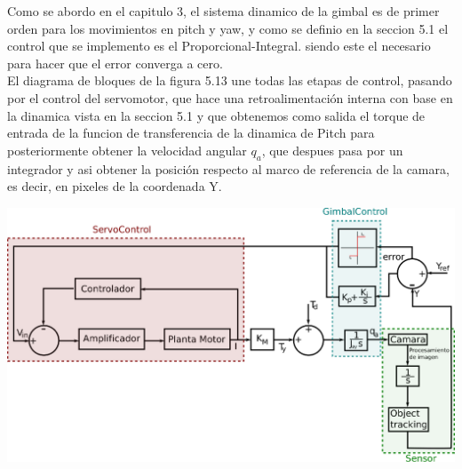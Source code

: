 Como se abordo en el capitulo 3, el sistema dinamico de la gimbal es de primer orden para los movimientos en pitch y yaw, y como se definio en la seccion 5.1
el control que se implemento es el Proporcional-Integral. siendo este el necesario para hacer que el error converga a cero.\\
El diagrama de bloques de la figura 5.13 une todas las etapas de control, pasando por el control del servomotor, que hace una retroalimentación interna con base
en la dinamica vista en la seccion 5.1 y que obtenemos como salida el torque de entrada de la funcion de transferencia de la dinamica de Pitch para posteriormente
obtener la velocidad angular $q_a$, que despues pasa por un integrador y asi obtener la posición respecto al marco de referencia de la camara, es decir, en 
pixeles de la coordenada Y.
\begin{center}
	\includegraphics[width=1.0\textwidth]{Contenido/Cuerpo/Capitulo5/Fig22.eps}
	\label{Fig4}
\end{center}

